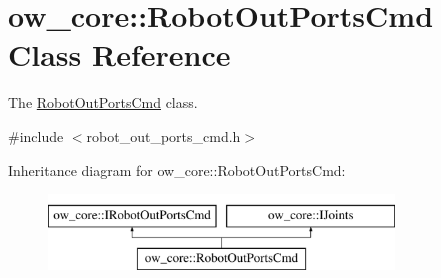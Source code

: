 \hypertarget{classow__core_1_1RobotOutPortsCmd}{}\section{ow\+\_\+core\+:\+:Robot\+Out\+Ports\+Cmd Class Reference}
\label{classow__core_1_1RobotOutPortsCmd}


The \hyperlink{classow__core_1_1RobotOutPortsCmd}{Robot\+Out\+Ports\+Cmd} class.  




{\ttfamily \#include $<$robot\+\_\+out\+\_\+ports\+\_\+cmd.\+h$>$}

Inheritance diagram for ow\+\_\+core\+:\+:Robot\+Out\+Ports\+Cmd\+:\begin{figure}[H]
\begin{center}
\leavevmode
\includegraphics[height=2.000000cm]{db/de7/classow__core_1_1RobotOutPortsCmd}
\end{center}
\end{figure}
